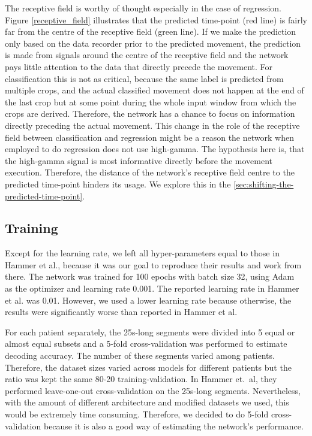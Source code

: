 The receptive field is worthy of thought especially in the case of regression.
Figure \ref{receptive_field} illustrates that the predicted time-point (red line) is fairly far from the centre of the receptive field (green line).
If we make the prediction only based on the data recorder prior to the predicted movement, the prediction is made from signals around the centre of the receptive field and the network pays little attention to the data that directly precede the movement.
For classification this is not as critical, because the same label is predicted from multiple crops, and the actual classified movement does not happen at the end of the last crop but at some point during the whole input window from which the crops are derived.
Therefore, the network has a chance to focus on information directly preceding the actual movement.
This change in the role of the receptive field between classification and regression might be a reason the network when employed to do regression does not use high-gamma.
The hypothesis here is, that the high-gamma signal is most informative directly before the movement execution.
Therefore, the distance of the network's receptive field centre to the predicted time-point hinders its usage.
We explore this in the \cref{sec:shifting-the-predicted-time-point}.

\subsection{Training}
Except for the learning rate, we left all hyper-parameters equal to those in Hammer et al., because it was our goal to reproduce their results and work from there.
The network was trained for 100 epochs with batch size 32, using Adam~\cite{kingma-adam-2017} as the optimizer and learning rate 0.001.
The reported learning rate in Hammer et al. was 0.01.
However, we used a lower learning rate because otherwise, the results were significantly worse than reported in Hammer et al.

For each patient separately, the 25s-long segments were divided into 5 equal or almost equal subsets and a 5-fold cross-validation was performed to estimate decoding accuracy.
The number of these segments varied among patients.
Therefore, the dataset sizes varied across models for different patients but the ratio was kept the same 80-20 training-validation.
In Hammer et.\ al, they performed leave-one-out cross-validation on the 25s-long segments.
Nevertheless, with the amount of different architecture and modified datasets we used, this would be extremely time consuming.
Therefore, we decided to do 5-fold cross-validation because it is also a good way of estimating the network's performance.

